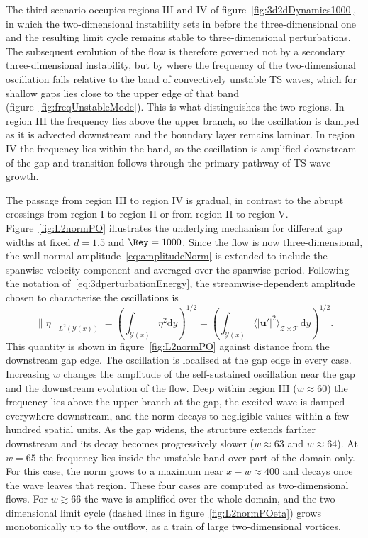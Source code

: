 \documentclass[lineno]{jfm}
\begin{document}
The third scenario occupies regions III and IV of figure~\ref{fig:3d2dDynamics1000}, in which the two-dimensional instability sets in before the three-dimensional one and the resulting limit cycle remains stable to three-dimensional perturbations. The subsequent evolution of the flow is therefore governed not by a secondary three-dimensional instability, but by where the frequency of the two-dimensional oscillation falls relative to the band of convectively unstable \ac{TS} waves, which for shallow gaps lies close to the upper edge of that band (figure~\ref{fig:freqUnstableMode}). This is what distinguishes the two regions. In region III the frequency lies above the upper branch, so the oscillation is damped as it is advected downstream and the boundary layer remains laminar. In region IV the frequency lies within the band, so the oscillation is amplified downstream of the gap and transition follows through the primary pathway of \ac{TS}-wave growth.

The passage from region III to region IV is gradual, in contrast to the abrupt crossings from region I to region II or from region II to region V. Figure~\ref{fig:L2normPO} illustrates the underlying mechanism for different gap widths at fixed $d=1.5$ and $\Rey=1000$. Since the flow is now three-dimensional, the wall-normal amplitude~\eqref{eq:amplitudeNorm} is extended to include the spanwise velocity component and averaged over the spanwise period. Following the notation of~\eqref{eq:3dperturbationEnergy}, the streamwise-dependent amplitude chosen to characterise the oscillations is 
\begin{equation}\label{eq:amplitudeNorm3D}
	\|\eta\|_{L^2(\mathcal{Y}(x))} = {\left( \int_{\mathcal{Y}(x)} {\eta^2} \mathrm{d}y \right)}^{1/2} = {\left( \int_{\mathcal{Y}(x)} {\langle |\boldsymbol{u}'|^2\rangle}_{\mathcal{Z}\times\mathcal{T}}\, \mathrm{d}y \right)}^{1/2}.
\end{equation}
This quantity is shown in figure~\ref{fig:L2normPO} against distance from the downstream gap edge. The oscillation is localised at the gap edge in every case. Increasing $w$ changes the amplitude of the self-sustained oscillation near the gap and the downstream evolution of the flow. Deep within region III ($w\approx 60$) the frequency lies above the upper branch at the gap, the excited wave is damped everywhere downstream, and the norm decays to negligible values within a few hundred spatial units. As the gap widens, the structure extends farther downstream and its decay becomes progressively slower ($w\approx 63$ and $w\approx 64$). At $w=65$ the frequency lies inside the unstable band over part of the domain only. For this case, the norm grows to a maximum near $x-w\approx400$ and decays once the wave leaves that region. These four cases are computed as two-dimensional flows. For $w\gtrsim66$ the wave is amplified over the whole domain, and the two-dimensional limit cycle (dashed lines in figure~\ref{fig:L2normPOeta}) grows monotonically up to the outflow, as a train of large two-dimensional vortices.
\end{document}
